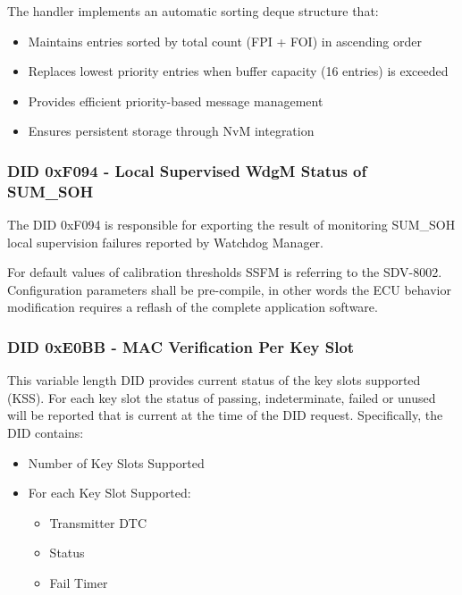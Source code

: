 The handler implements an automatic sorting deque structure that:
\begin{itemize}
    \item Maintains entries sorted by total count (FPI + FOI) in ascending order
    \item Replaces lowest priority entries when buffer capacity (16 entries) is exceeded
    \item Provides efficient priority-based message management
    \item Ensures persistent storage through NvM integration
\end{itemize}


{}

\subsubsection{DID 0xF094 - Local Supervised WdgM Status of SUM_SOH}


The DID 0xF094 is responsible for exporting the result of monitoring SUM_SOH local supervision failures reported by Watchdog
Manager.

For default values of calibration thresholds SSFM is referring to the SDV-8002. Configuration parameters
shall be pre-compile, in other words the ECU behavior modification requires a reflash of the
complete application software.

{ }

\subsubsection{DID 0xE0BB - MAC Verification Per Key Slot}
\label{subsubsec:DIDE0BB}

This variable length DID provides current status of the key slots supported (KSS). 
For each key slot the status of passing, indeterminate, failed or unused will be reported that is current at the time of the DID request.
Specifically, the DID contains:

\begin{itemize}
    \item Number of Key Slots Supported
    \item For each Key Slot Supported:
    \begin{itemize}
        \item Transmitter DTC
        \item Status
        \item Fail Timer
    \end{itemize}
\end{itemize}

